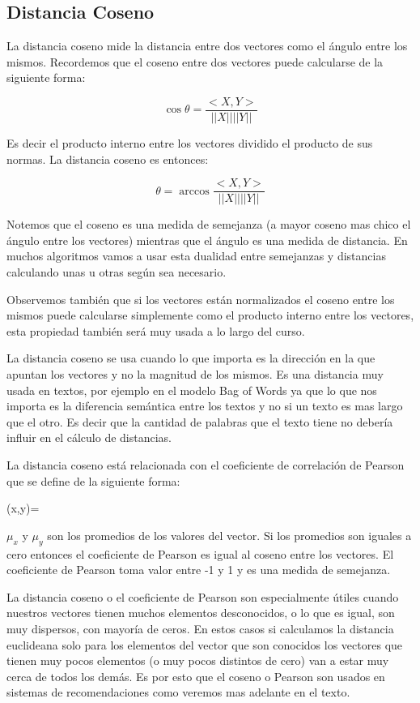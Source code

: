 \subsection{Distancia Coseno} La distancia coseno mide la distancia entre dos vectores como el ángulo entre los mismos. Recordemos que el coseno entre dos vectores puede calcularse de la siguiente forma:

$$\cos \theta = \frac{<X,Y>}{||X|| ||Y||}$$

Es decir el producto interno entre los vectores dividido el producto de sus normas. La distancia coseno es entonces:

$$\theta = \arccos \frac{<X,Y>}{||X|| ||Y||}$$

Notemos que el coseno es una medida de semejanza (a mayor coseno mas chico el ángulo entre los vectores) mientras que el ángulo es una medida de distancia. En muchos algoritmos vamos a usar esta dualidad entre semejanzas y distancias calculando unas u otras según sea necesario.

Observemos también que si los vectores están normalizados el coseno entre los mismos puede calcularse simplemente como el producto interno entre los vectores, esta propiedad también será muy usada a lo largo del curso.

La distancia coseno se usa cuando lo que importa es la dirección en la que apuntan los vectores y no la magnitud de los mismos. Es una distancia muy usada en textos, por ejemplo en el modelo Bag of Words ya que lo que nos importa es la diferencia semántica entre los textos y no si un texto es mas largo que el otro. Es decir que la cantidad de palabras que el texto tiene no debería influir en el cálculo de distancias. 

La distancia coseno está relacionada con el coeficiente de correlación de Pearson que se define de la siguiente forma:

\begin{myequation}
\rho(x,y)=
\end{myequation}

$\mu_x$ y $\mu_y$ son los promedios de los valores del vector. Si los promedios son iguales a cero entonces el coeficiente de Pearson es igual al coseno entre los vectores. El coeficiente de Pearson toma valor entre -1 y 1 y es una medida de semejanza. 

La distancia coseno o el coeficiente de Pearson son especialmente útiles cuando nuestros vectores tienen muchos elementos desconocidos, o lo que es igual, son muy dispersos, con mayoría de ceros. En estos casos si calculamos la distancia euclideana solo para los elementos del vector que son conocidos los vectores que tienen muy pocos elementos (o muy pocos distintos de cero) van a estar muy cerca de todos los demás. Es por esto que el coseno o Pearson son usados en sistemas de recomendaciones como veremos mas adelante en el texto.

